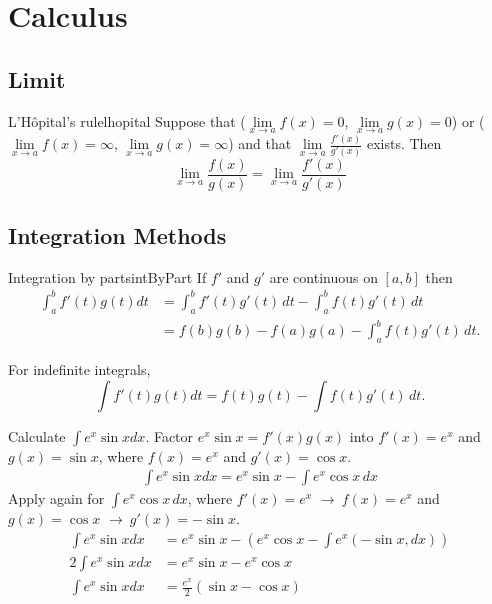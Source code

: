 \documentclass[11pt,a4paper,fleqn]{article}
\numberwithin{equation}{section}
\newcommand{\g}{$\rightarrow\ $}
\begin{document}
\clearpage

\section{Calculus}
\subsection{Limit}
\begin{fact}{L'Hôpital's rule}{lhopital}
    Suppose that ($\lim\limits_{x\rightarrow a}f(x)=0$, $\lim\limits_{x\rightarrow a}g(x)=0$) or ($\lim\limits_{x\rightarrow a}f(x)=\infty$, $\lim\limits_{x\rightarrow a}g(x)=\infty$) and that $\lim\limits_{x\rightarrow a}\frac{f'(x)}{g'(x)}$ exists.
    Then
    \[
    \lim\limits_{x\rightarrow a}\frac{f(x)}{g(x)} = \lim\limits_{x\rightarrow a}\frac{f'(x)}{g'(x)}
    \]
\end{fact}

\subsection{Integration Methods}
\begin{fact}{Integration by parts}{intByPart}
    If $f'$ and $g'$ are continuous on $[a,b]$ then
    \begin{align*}
        \int_{a}^{b} f'(t)g(t) dt & = \int_{a}^{b} f'(t)g'(t)\,dt - \int_{a}^{b} f(t)g'(t)\,dt\\
        & = f(b)g(b)-f(a)g(a) - \int_{a}^{b} f(t)g'(t)\,dt.
    \end{align*}
    
    For indefinite integrals,
    \[
    \int f'(t)g(t) dt = f(t)g(t) - \int f(t)g'(t)\,dt.
    \]
\end{fact}

\begin{exec}
    Calculate $\int e^x \sin{x} dx$.
    \tcblower
    Factor $e^x\sin{x} = f'(x)g(x)$ into $f'(x) =e^x$ and $g(x)=\sin{x}$,
    where $f(x)=e^x$ and $g'(x)=\cos{x}$.
    \begin{align*}
        \int e^x \sin{x} dx = e^x \sin{x} - \int e^x \cos{x}\,dx
    \end{align*}
    Apply  again for $\int e^x \cos{x}\,dx$,
    where $f'(x)=e^x$ \g $f(x)=e^x$ and $g(x)=\cos{x}$ \g $g'(x)=-\sin{x}$.
    \begin{align*}
        \int e^x \sin{x} dx &= e^x \sin{x} - (e^x\cos{x}-\int e^x (-\sin{x},dx))\\
        2\int e^x \sin{x} dx &= e^x \sin{x} - e^x\cos{x} \\
        \int e^x \sin{x} dx &= \frac{e^x}{2} \left(\sin{x} - \cos{x}\right)
    \end{align*}
\end{exec}
\end{document}
